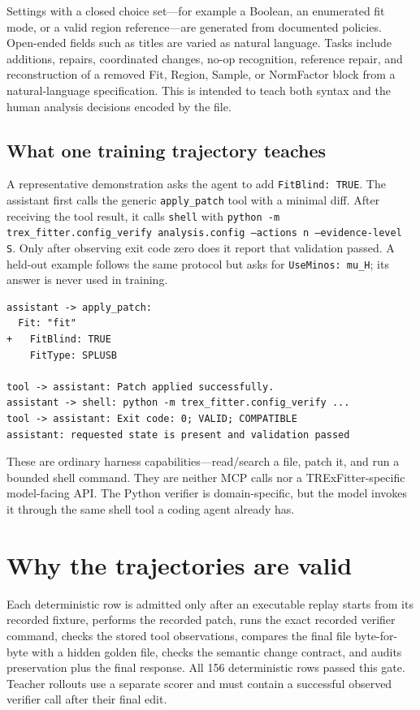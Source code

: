 \documentclass[11pt]{article}
\newcommand{\code}[1]{\texttt{#1}}
\begin{document}
Settings with a closed choice set---for example a Boolean, an enumerated fit
mode, or a valid region reference---are generated from documented policies.
Open-ended fields such as titles are varied as natural language.  Tasks include
additions, repairs, coordinated changes, no-op recognition, reference repair,
and reconstruction of a removed Fit, Region, Sample, or NormFactor block from a
natural-language specification.  This is intended to teach both syntax and the
human analysis decisions encoded by the file.

\subsection{What one training trajectory teaches}

A representative demonstration asks the agent to add \code{FitBlind: TRUE}.
The assistant first calls the generic \code{apply\_patch} tool with a minimal
diff.  After receiving the tool result, it calls \code{shell} with
\code{python -m trex\_fitter.config\_verify analysis.config --actions n
--evidence-level S}.  Only after observing exit code zero does it report that
validation passed.  A held-out example follows the same protocol but asks for
\code{UseMinos: mu\_H}; its answer is never used in training.

\begin{verbatim}
assistant -> apply_patch:
  Fit: "fit"
+   FitBlind: TRUE
    FitType: SPLUSB

tool -> assistant: Patch applied successfully.
assistant -> shell: python -m trex_fitter.config_verify ...
tool -> assistant: Exit code: 0; VALID; COMPATIBLE
assistant: requested state is present and validation passed
\end{verbatim}

These are ordinary harness capabilities---read/search a file, patch it, and run
a bounded shell command.  They are neither MCP calls nor a TRExFitter-specific
model-facing API.  The Python verifier is domain-specific, but the model invokes
it through the same shell tool a coding agent already has.

\section{Why the trajectories are valid}

Each deterministic row is admitted only after an executable replay starts from
its recorded fixture, performs the recorded patch, runs the exact recorded
verifier command, checks the stored tool observations, compares the final file
byte-for-byte with a hidden golden file, checks the semantic change contract,
and audits preservation plus the final response.  All 156 deterministic rows
passed this gate.  Teacher rollouts use a separate scorer and must contain a
successful observed verifier call after their final edit.
\end{document}
